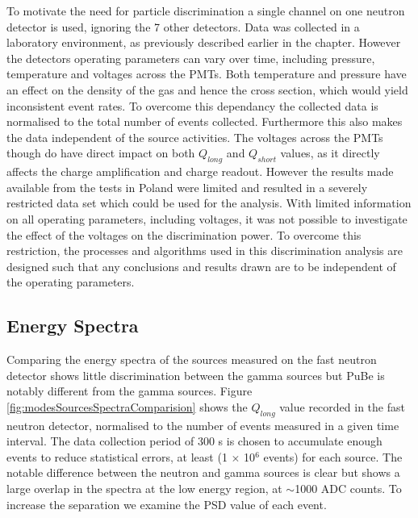 To motivate the need for particle discrimination a single channel on one neutron detector is used, ignoring the 7 other detectors. Data was collected in a laboratory environment, as previously described earlier in the chapter. However the detectors operating parameters can vary over time, including pressure, temperature and voltages across the PMTs. Both temperature and pressure have an effect on the density of the gas and hence the cross section, which would yield inconsistent event rates. To overcome this dependancy the collected data is normalised to the total number of events collected. Furthermore this also makes the data independent of the source activities. The voltages across the PMTs though do have direct impact on both $Q_{long}$ and $Q_{short}$ values, as it directly affects the charge amplification and charge readout. However the results made available from the tests in Poland were limited and resulted in a severely restricted data set which could be used for the analysis. With limited information on all operating parameters, including voltages, it was not possible to investigate the effect of the voltages on the discrimination power. To overcome this restriction, the processes and algorithms used in this discrimination analysis are designed such that any conclusions and results drawn are to be independent of the operating parameters.

\subsection{Energy Spectra} 
Comparing the energy spectra of the sources measured on the fast neutron detector shows little discrimination between the gamma sources but PuBe is notably different from the gamma sources. Figure \ref{fig:modesSourcesSpectraComparision} shows the $Q_{long}$ value recorded in the fast neutron detector, normalised to the number of events measured in a given time interval. The data collection period of 300 s is chosen to accumulate enough events to reduce statistical errors, at least (1 $\times$ 10$^{6}$ events) for each source. The notable difference between the neutron and gamma sources is clear but shows a large overlap in the spectra at the low energy region, at $\sim$1000 ADC counts. To increase the separation we examine the PSD value of each event.

